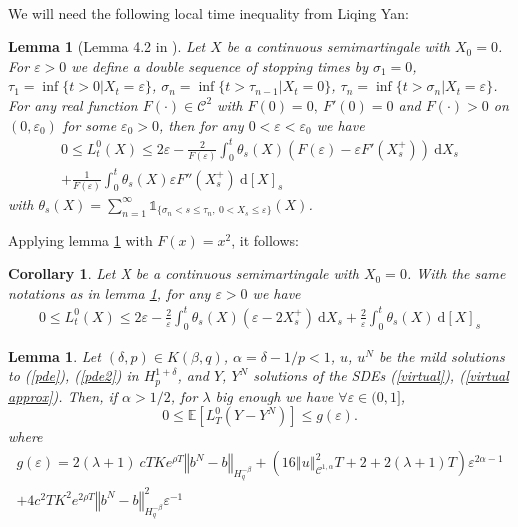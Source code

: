 \documentclass[12pt]{article}
\newtheorem{lem}[theo]{Lemma}
\newtheorem{cor}[theo]{Corollary}
\newcommand{\norme}[1]{\left\Vert #1\right\Vert}
\newcommand{\E}{\mathbb{E}}
\newcommand{\di}{\mathrm{d}}
\begin{document}
        \paragraph{}
        We will need the following local time inequality from Liqing Yan:        
        \begin{lem}[Lemma 4.2 in \cite{Yan}]\label{local}
            Let $X$ be a continuous semimartingale with $X_0 = 0$. For $\varepsilon>0$ we define a double sequence of stopping times by $\sigma_1 = 0$, $\tau_1=\inf\{t>0 | X_t=\varepsilon\}$, $\sigma_n = \inf\{t>\tau_{n-1}|X_t=0\}$, $\tau_n=\inf\{t>\sigma_n|X_t=\varepsilon\}$. For any real function $F(\cdot)\in\mathcal{C}^2$ with $F(0)=0,\ F'(0) = 0$ and $F(\cdot) > 0$ on $(0,\varepsilon_0)$ for some $\varepsilon_0 > 0$, then for any $0<\varepsilon<\varepsilon_0$ we have
            \begin{multline*}
                0\leq L^0_t(X) \leq 2\varepsilon - \frac{2}{F(\varepsilon)}\int_0^t \theta_s(X) \left(F\left(\varepsilon\right) - \varepsilon F'\left(X_s^+\right)\right)\ \di X_s\\
                +\frac{1}{F(\varepsilon)}\int_0^t \theta_s(X)\varepsilon F''(X_s^+)\ \di[X]_s
            \end{multline*}
            with $\theta_s(X) = \sum_{n=1}^\infty \mathds{1}_{\{\sigma_n< s\leq \tau_n,\ 0<X_s\leq \varepsilon\}}(X)$.
        \end{lem}        
        Applying lemma \ref{local} with $F(x) = x^2$, it follows:
        \begin{cor}\label{cor}
            Let X be a continuous semimartingale with $X_0 = 0$. With the same notations as in lemma \ref{local}, for any $\varepsilon>0$ we have
            \begin{multline}
                0\leq L^0_t(X) \leq 2\varepsilon - \frac{2}{\varepsilon}\int_0^t \theta_s(X) \left(\varepsilon - 2{X_s^+}\right)\ \di X_s
                +\frac{2}{\varepsilon}\int_0^t \theta_s(X) \ \di[X]_s
            \end{multline}
        \end{cor}

\begin{lem}\label{local time}
    Let $(\delta,p)\in K(\beta,q)$, $\alpha=\delta-1/p<1$, $u$, $u^N$ be the mild solutions to (\ref{pde}), (\ref{pde2}) in $H_p^{1+\delta}$, and $Y$, $Y^N$ solutions of the SDEs (\ref{virtual}), (\ref{virtual approx}).  Then, if $\alpha>1/2$, for $\lambda$ big enough we have $\forall\varepsilon\in(0,1]$,
    \begin{equation*}
    0\leq \E\left[L^0_T(Y-Y^N)\right]\leq  g(\varepsilon).
    \end{equation*}
    where \begin{multline*}
    g(\varepsilon) = 2(\lambda + 1)\ cT Ke^{\rho T}\norme{b^N-b}_{H^{-\beta}_{q}} + \left(16\norme{u}_{\mathcal{C}^{1,\alpha}}^2 T + 2+2(\lambda + 1)T\right) \varepsilon^{2\alpha-1}\\
    + 4c^2T K^2e^{2\rho T}\norme{b^N-b}_{H^{-\beta}_{q}}^2\varepsilon^{-1}
    \end{multline*}
\end{lem}
\end{document}
